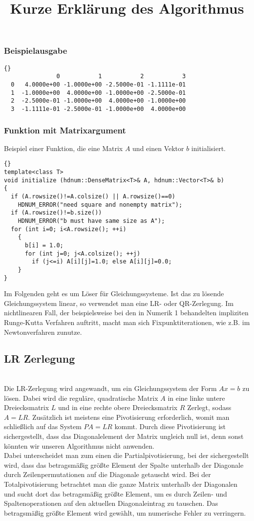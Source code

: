 \documentclass[a4paper,11pt]{article}
\theoremstyle{definition}
\begin{document}
\begin{frame}[fragile]
\frametitle{Beispielausgabe}
{\footnotesize{\begin{lstlisting}{}
               0           1           2           3
  0   4.0000e+00 -1.0000e+00 -2.5000e-01 -1.1111e-01
  1  -1.0000e+00  4.0000e+00 -1.0000e+00 -2.5000e-01
  2  -2.5000e-01 -1.0000e+00  4.0000e+00 -1.0000e+00
  3  -1.1111e-01 -2.5000e-01 -1.0000e+00  4.0000e+00
\end{lstlisting}}}
\end{frame}

\begin{frame}[fragile]
\frametitle{Funktion mit Matrixargument}
Beispiel einer Funktion, die eine Matrix $A$ und einen Vektor $b$
initialisiert.

{\footnotesize{\begin{lstlisting}{}
template<class T>
void initialize (hdnum::DenseMatrix<T>& A, hdnum::Vector<T>& b)
{
  if (A.rowsize()!=A.colsize() || A.rowsize()==0)
    HDNUM_ERROR("need square and nonempty matrix");
  if (A.rowsize()!=b.size())
    HDNUM_ERROR("b must have same size as A");
  for (int i=0; i<A.rowsize(); ++i)
    {
      b[i] = 1.0;
      for (int j=0; j<A.colsize(); ++j)
        if (j<=i) A[i][j]=1.0; else A[i][j]=0.0;
    }
}
\end{lstlisting}}}
\end{frame}

Im Folgenden geht es um Löser für Gleichungssysteme. Ist das zu lösende Gleichungssystem linear, so verwendet man eine LR- oder QR-Zerlegung. Im nichtlinearen Fall, der beispielsweise bei den in Numerik 1 behandelten impliziten Runge-Kutta Verfahren auftritt, macht man sich Fixpunktiterationen, wie z.B. im Newtonverfahren zunutze.

\subsection{LR Zerlegung}

\title{\textbf{Kurze Erklärung des Algorithmus}}\\
Die LR-Zerlegung wird angewandt, um ein Gleichungssystem der Form $Ax=b$ zu lösen. Dabei wird die reguläre, quadratische Matrix $A$ in eine linke untere Dreiecksmatrix $L$ und in eine rechte obere Dreiecksmatrix $R$ Zerlegt, sodass $A=LR$. Zusätzlich ist meistens eine Pivotisierung erforderlich, womit man schließlich auf das System $PA=LR$ kommt. Durch diese Pivotisierung ist sichergestellt, dass das Diagonalelement der Matrix ungleich null ist, denn sonst könnten wir unseren Algorithmus nicht anwenden.\\
Dabei unterscheidet man zum einen die Partialpivotisierung, bei der sichergestellt wird, dass das betragsmäßig größte Element der Spalte unterhalb der Diagonale durch Zeilenpermutationen auf die Diagonale getauscht wird. Bei der Totalpivotisierung betrachtet man die ganze Matrix unterhalb der Diagonalen und sucht dort das betragsmäßig größte Element, um es durch Zeilen- und Spaltenoperationen auf den aktuellen Diagonaleintrag zu tauschen.
Das betragsmäßig größte Element wird gewählt, um numerische Fehler zu verringern.\\
\end{document}
